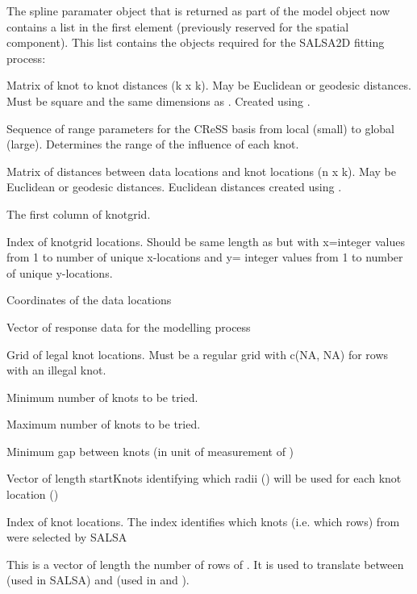 \documentclass[a4paper]{book}
\begin{document}
\begin{Value}
The spline paramater object that is returned as part of the model object now contains a list in the first element (previously reserved for the spatial component).  This list contains the objects required for the SALSA2D fitting process:

\begin{ldescription}
\item[\code{knotDist}] Matrix of knot to knot distances (k x k).  May be Euclidean or geodesic distances. Must be square and the same dimensions as .  Created using .
\item[\code{radii}] Sequence of range parameters for the CReSS basis from local (small) to global (large).  Determines the range of the influence of each knot.
\item[\code{dist}]  Matrix of distances between data locations and knot locations (n x k). May be Euclidean or geodesic distances. Euclidean distances created using .
\item[\code{gridresp}] The first column of knotgrid.
\item[\code{grid}] Index of knotgrid locations.  Should be same length as  but with x=integer values from 1 to number of unique x-locations and y= integer values from 1 to number of unique y-locations.
\item[\code{datacoords}] Coordinates of the data locations
\item[\code{response}] Vector of response data for the modelling process
\item[\code{knotgrid}] Grid of legal knot locations.  Must be a regular grid with c(NA, NA) for rows with an illegal knot.
\item[\code{minKnots}] Minimum number of knots to be tried.
\item[\code{maxKnots}] Maximum number of knots to be tried.
\item[\code{gap}] Minimum gap between knots (in unit of measurement of )
\item[\code{radiusIndices}] Vector of length startKnots identifying which radii () will be used for each knot location ()
\item[\code{knotPos}] Index of knot locations. The index identifies which knots (i.e. which rows) from  were selected by SALSA
\item[\code{invInd}] This is a vector of length the number of rows of .  It is used to translate between  (used in SALSA) and  (used in  and ).
\end{ldescription}
\end{Value}
\end{document}
